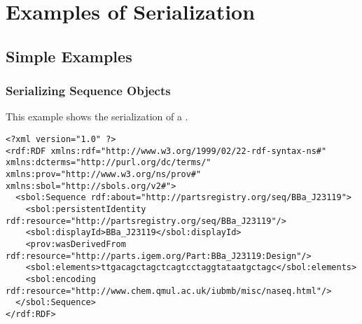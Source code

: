 \section{Examples of Serialization}
\label{ser:examples}
\subsection{Simple Examples}

\subsubsection{Serializing Sequence Objects}
This example shows the serialization of a .
\begin{lstlisting}
<?xml version="1.0" ?>
<rdf:RDF xmlns:rdf="http://www.w3.org/1999/02/22-rdf-syntax-ns#" xmlns:dcterms="http://purl.org/dc/terms/" xmlns:prov="http://www.w3.org/ns/prov#" xmlns:sbol="http://sbols.org/v2#">
  <sbol:Sequence rdf:about="http://partsregistry.org/seq/BBa_J23119">
    <sbol:persistentIdentity rdf:resource="http://partsregistry.org/seq/BBa_J23119"/>
    <sbol:displayId>BBa_J23119</sbol:displayId>
    <prov:wasDerivedFrom rdf:resource="http://parts.igem.org/Part:BBa_J23119:Design"/>
    <sbol:elements>ttgacagctagctcagtcctaggtataatgctagc</sbol:elements>
    <sbol:encoding rdf:resource="http://www.chem.qmul.ac.uk/iubmb/misc/naseq.html"/>
  </sbol:Sequence>
</rdf:RDF>
\end{lstlisting}


